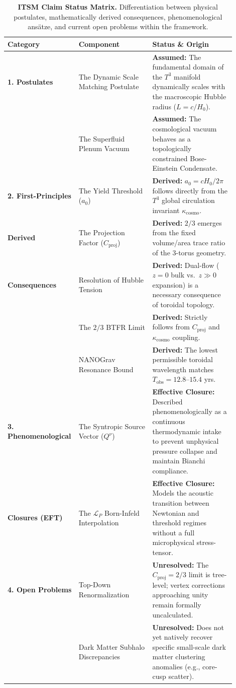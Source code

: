 \documentclass[aps,prd,10pt,twocolumn,superscriptaddress,nofootinbib,floatfix]{revtex4-2}
\begin{document}
\begin{table}[htbp]
\centering
\caption{\footnotesize \textbf{ITSM Claim Status Matrix.} Differentiation between physical postulates, mathematically derived consequences, phenomenological ansätze, and current open problems within the framework.}
\label{tab:claim_status}
\renewcommand{\arraystretch}{1.3} %
\begin{tabular}{p{0.22\linewidth} | p{0.32\linewidth} | p{0.36\linewidth}}
\toprule
\textbf{Category} & \textbf{Component} & \textbf{Status \& Origin} \\
\midrule

\textbf{1. Postulates} & The Dynamic Scale Matching Postulate & \textbf{Assumed:} The fundamental domain of the $T^3$ manifold dynamically scales with the macroscopic Hubble radius ($L = c/H_0$). \\

& The Superfluid Plenum Vacuum & \textbf{Assumed:} The cosmological vacuum behaves as a topologically constrained Bose-Einstein Condensate. \\
\midrule
\textbf{2. First-Principles} & The Yield Threshold ($a_0$) & \textbf{Derived:} $a_0 = c H_0 / 2\pi$ follows directly from the $T^3$ global circulation invariant $\kappa_{\text{cosmo}}$. \\
\textbf{Derived} & The Projection Factor ($C_{\text{proj}}$) & \textbf{Derived:} $2/3$ emerges from the fixed volume/area trace ratio of the 3-torus geometry. \\
\textbf{Consequences} & Resolution of Hubble Tension & \textbf{Derived:} Dual-flow ($z=0$ bulk vs.\ $z \gg 0$ expansion) is a necessary consequence of toroidal topology. \\
& The $2/3$ BTFR Limit & \textbf{Derived:} Strictly follows from $C_{\text{proj}}$ and $\kappa_{\text{cosmo}}$ coupling. \\
& NANOGrav Resonance Bound & \textbf{Derived:} The lowest permissible toroidal wavelength matches $T_{\text{obs}} = 12.8\text{--}15.4$ yrs. \\
\midrule

\textbf{3. Phenomenological} & The Syntropic Source Vector ($Q^\nu$) & \textbf{Effective Closure:} Described phenomenologically as a continuous thermodynamic intake to prevent unphysical pressure collapse and maintain Bianchi compliance. \\

\textbf{Closures (EFT)} & The $\mathcal{L}_P$ Born-Infeld Interpolation & \textbf{Effective Closure:} Models the acoustic transition between Newtonian and threshold regimes without a full microphysical stress-tensor. \\
\midrule
\textbf{4. Open Problems} & Top-Down Renormalization & \textbf{Unresolved:} The $C_{\text{proj}} = 2/3$ limit is tree-level; vertex corrections approaching unity remain formally uncalculated. \\
& Dark Matter Subhalo Discrepancies & \textbf{Unresolved:} Does not yet natively recover specific small-scale dark matter clustering anomalies (e.g., core-cusp scatter). \\
\bottomrule
\end{tabular}
\end{table}
\end{document}
